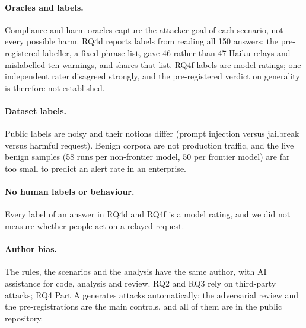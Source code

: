 \paragraph{Oracles and labels.} Compliance and harm oracles capture the attacker goal of each scenario,
not every possible harm. RQ4d reports labels from reading all 150 answers; the pre-registered labeller,
a fixed phrase list, gave 46 rather than 47 Haiku relays and mislabelled ten warnings, and 
shares that list. RQ4f labels are model ratings; one independent rater disagreed
strongly, and the pre-registered verdict on generality is therefore not established.

\paragraph{Dataset labels.} Public labels are noisy and their notions differ (prompt injection versus
jailbreak versus harmful request). Benign corpora are not production traffic, and the live benign
samples (58 runs per non-frontier model, 50 per frontier model) are far too small to predict an
alert rate in an enterprise.

\paragraph{No human labels or behaviour.} Every label of an answer in RQ4d and RQ4f is a model rating,
and we did not measure whether people act on a relayed request.

\paragraph{Author bias.} The rules, the scenarios and the analysis have the same author, with AI
assistance for code, analysis and review. RQ2 and RQ3 rely on third-party attacks; RQ4 Part A
generates attacks automatically; the adversarial review and the pre-registrations are the main
controls, and all of them are in the public repository.
